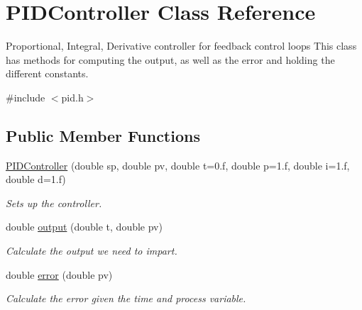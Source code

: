 \hypertarget{class_p_i_d_controller}{}\section{P\+I\+D\+Controller Class Reference}
\label{class_p_i_d_controller}


Proportional, Integral, Derivative controller for feedback control loops This class has methods for computing the output, as well as the error and holding the different constants.  




{\ttfamily \#include $<$pid.\+h$>$}

\subsection*{Public Member Functions}
\begin{DoxyCompactItemize}
\item 
\mbox{\hyperlink{class_p_i_d_controller_adc1fe861be2cf7aec13fa7855a4c3412}{P\+I\+D\+Controller}} (double sp, double pv, double t=0.f, double p=1.f, double i=1.f, double d=1.f)
\begin{DoxyCompactList}\small\item\em Sets up the controller. \end{DoxyCompactList}\item 
double \mbox{\hyperlink{class_p_i_d_controller_ad8d86f165bb52832ad0ea74d2c6914cc}{output}} (double t, double pv)
\begin{DoxyCompactList}\small\item\em Calculate the output we need to impart. \end{DoxyCompactList}\item 
double \mbox{\hyperlink{class_p_i_d_controller_aa5a018e2fb2330d74399fdfaa9adbf54}{error}} (double pv)
\begin{DoxyCompactList}\small\item\em Calculate the error given the time and process variable. \end{DoxyCompactList}\end{DoxyCompactItemize}
